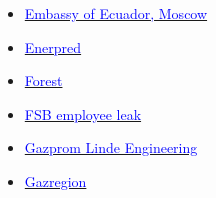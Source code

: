 \documentclass[aspectratio=169,usenames,dvipsnames]{beamer}
\begin{document}
\begin{frame}[t]
\begin{columns}[T]
\begin{itemize}
      \item \href{https://ddosecrets.com/wiki/Embassy_of_Ecuador,_Moscow}{\textcolor{blue}{Embassy of Ecuador, Moscow}}
      \item \href{https://ddosecrets.com/wiki/Enerpred}{\textcolor{blue}{Enerpred}}
      \item \href{https://ddosecrets.com/wiki/Forest}{\textcolor{blue}{Forest}}
      \item \href{https://ddosecrets.com/wiki/FSB_employee_leak}{\textcolor{blue}{FSB employee leak}}
      \item \href{https://ddosecrets.com/wiki/Gazprom_Linde_Engineering}{\textcolor{blue}{Gazprom Linde Engineering}}
      \item \href{https://ddosecrets.com/wiki/Gazregion}{\textcolor{blue}{Gazregion}}
    \end{itemize}
  \end{columns}
\end{frame}
\end{document}
